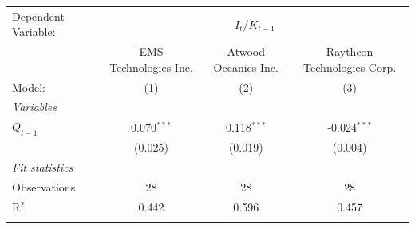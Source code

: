 \begin{tabular}{lccc}
   \tabularnewline \midrule \midrule
   Dependent Variable: & \multicolumn{3}{c}{$I_t/K_{t-1}$}\\
                & EMS Technologies Inc. & Atwood Oceanics Inc. & Raytheon Technologies Corp. \\   
   Model:       & (1)                   & (2)                  & (3)\\  
   \midrule
   \emph{Variables}\\
   $Q_{t-1}$    & 0.070$^{***}$         & 0.118$^{***}$        & -0.024$^{***}$\\   
                & (0.025)               & (0.019)              & (0.004)\\   
   \midrule
   \emph{Fit statistics}\\
   Observations & 28                    & 28                   & 28\\  
   R$^2$        & 0.442                 & 0.596                & 0.457\\  
   \midrule \midrule & \tabularnewline
\end{tabular}
